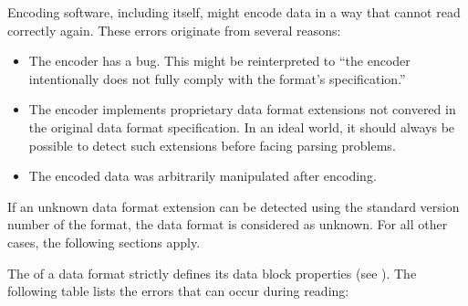 Encoding software, including \LibName{} itself, might encode data in a way that \LibName{} cannot read correctly again. These errors originate from several reasons:
\begin{itemize}
	\item The encoder has a bug. This might be reinterpreted to ``the encoder intentionally does not fully comply with the format's specification.''
	\item The encoder implements proprietary data format extensions not convered in the original data format specification. In an ideal world, it should always be possible to detect such extensions before facing parsing problems.
	\item The encoded data was arbitrarily manipulated after encoding.
\end{itemize}

If an unknown data format extension can be detected using the standard version number of the format, the data format is considered as unknown. For all other cases, the following sections apply.

The \IFDataFormatSpecification{} of a data format strictly defines its data block properties (see ). The following table lists the errors that can occur during reading:

